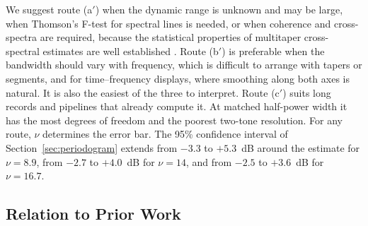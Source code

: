 \documentclass[10pt,twocolumn]{article}
\begin{document}
We suggest route (a$'$) when the dynamic range is unknown and may be large, when Thomson's F-test for spectral lines is needed, or when coherence and cross-spectra are required, because the statistical properties of multitaper cross-spectral estimates are well established \cite{walden2000}. Route (b$'$) is preferable when the bandwidth should vary with frequency, which is difficult to arrange with tapers or segments, and for time--frequency displays, where smoothing along both axes is natural. It is also the easiest of the three to interpret. Route (c$'$) suits long records and pipelines that already compute it. At matched half-power width it has the most degrees of freedom and the poorest two-tone resolution. For any route, $\nu$ determines the error bar. The 95\% confidence interval of Section~\ref{sec:periodogram} extends from $-3.3$ to $+5.3$~dB around the estimate for $\nu=8.9$, from $-2.7$ to $+4.0$~dB for $\nu=14$, and from $-2.5$ to $+3.6$~dB for $\nu=16.7$.


\subsection{Relation to Prior Work}
\label{sec:prior}
\end{document}
